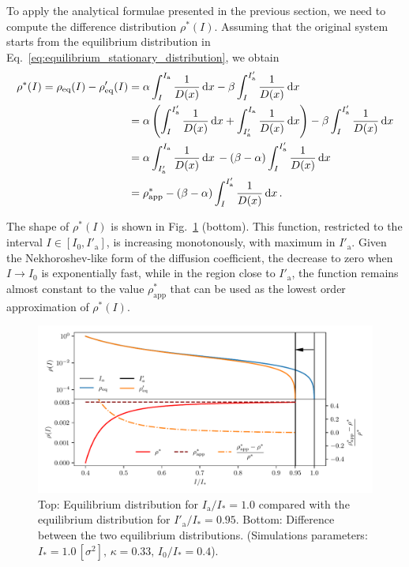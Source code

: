 {To apply the analytical formulae presented in the previous section, we need to compute the difference distribution $\rho^\ast(I)$. Assuming that the original system starts from the equilibrium distribution in Eq.~\eqref{eq:equilibrium_stationary_distribution}, we obtain 
\begin{align}
    \rho^\ast(I) = \rho_\text{eq}(I) - \rho'_\text{eq}(I) 
    &= \alpha \int_I^{I_\mathrm{a}} \frac{1}{D(x)}\,\mathrm{d}x - \beta \int_I^{I'_\mathrm{a}} \frac{1}{D(x)}\,\mathrm{d}x \notag \\
    &= \alpha \left( 
          \int_{I}^{I'_\mathrm{a}} \frac{1}{D(x)}\,\mathrm{d}x 
        + \int_{I'_\mathrm{a}}^{I_\mathrm{a}} \frac{1}{D(x)}\,\mathrm{d}x \right) - \beta \int_I^{I'_\mathrm{a}} \frac{1}{D(x)}\,\mathrm{d}x \notag \\
    &=  \alpha \int_{I'_\mathrm{a}}^{I_\mathrm{a}} \frac{1}{D(x)}\,\mathrm{d}x \, - (\beta - \alpha) \int_{I}^{I'_\mathrm{a}} \frac{1}{D(x)}\,\mathrm{d}x \notag \\
    &=  \rho^\ast_\text{app} - (\beta - \alpha) \int_{I}^{I'_\mathrm{a}} \frac{1}{D(x)}\,\mathrm{d}x \, .
    \label{eq:inward_difference}
\end{align}

The shape of $\rho^\ast(I)$ is shown in Fig.~\ref{fig:4} (bottom). This function, restricted to the interval $I \in [I_0, I'_\mathrm{a}]$, is increasing monotonously, with maximum in $I'_\mathrm{a}$. Given the Nekhoroshev-like form of the diffusion coefficient, the decrease to zero when $I \to I_0$ is exponentially fast, while in the region close to $I'_\mathrm{a}$, the function remains almost constant to the value $\rho^\ast_\text{app}$ that can be used as the lowest order approximation of $\rho^\ast(I)$.

\begin{figure}[htp]
    \centering
    \includegraphics[width=\textwidth]{4_probing_the_diffusive_behavior/figs/final/difference_backwards_s.pdf}
    \caption{Top: Equilibrium distribution for $I_\mathrm{a}/I_\ast = 1.0$ compared with the  equilibrium distribution for $I'_\mathrm{a}/I_\ast = 0.95$. Bottom: Difference between the two equilibrium distributions. (Simulations parameters: $I_\ast = 1.0\,[\sigma^2],\, \kappa = 0.33,\, I_0/I_\ast = 0.4$).}
    \label{fig:4}
\end{figure}

}
